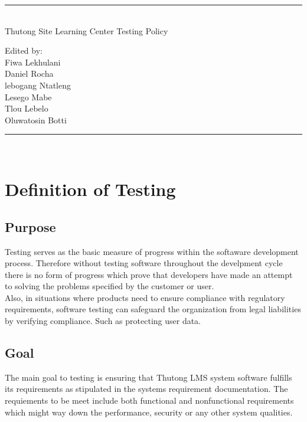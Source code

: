\documentclass[a4paper,12pt]{article}
\begin{document}
	
	\begin{titlepage}
		\centering
		\vspace*{\fill}
		
		\vspace*{0.5cm}
		
		\huge\bfseries
		\rule{\textwidth}{1.6pt}\\[\baselineskip]
		Thutong Site Learning Center Testing Policy
		
		\vspace*{0.5cm}
		
		\large Edited by: \\[\baselineskip]
		
		{Fiwa Lekhulani\\Daniel Rocha\\lebogang Ntatleng\\Lesego Mabe\\Tlou Lebelo\\Oluwatosin Botti}
		
		\rule{\textwidth}{1.6pt}\\[\baselineskip]
		
		
		\vspace*{\fill}
	\end{titlepage}
	
	
	\date{\textbf{\today}}
	\pagebreak
	\tableofcontents
	\newpage
	
	\section{Definition of Testing}
	
	\subsection{Purpose}
	Testing serves as the basic measure of progress within the softaware development process. Therefore without testing software throughout the develpment cycle there is no form of progress which prove that developers have made an attempt to solving the problems specified by the customer or user. \\ 
	
	Also, in situations where products need to ensure compliance with regulatory requirements, software testing can safeguard the organization from legal liabilities by verifying compliance. Such as protecting user data.
	
	\subsection{Goal}
	The main goal to testing is ensuring that Thutong LMS system software fulfills its requirements as stipulated in the systems requirement documentation. The requiements to be meet include both functional and nonfunctional requirements which might way down the performance, security or any other system qualities.
	
\end{document}
